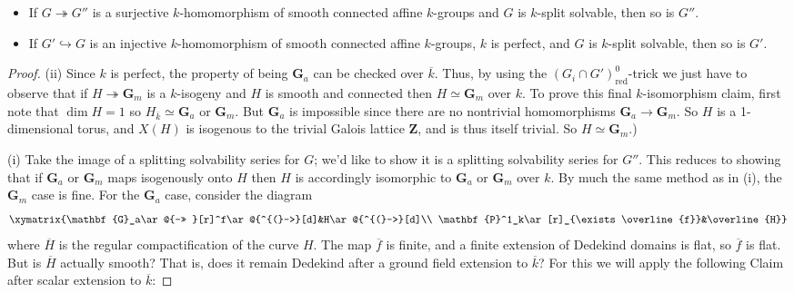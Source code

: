 \documentclass[10pt]{article}
\makeatletter
\renewcommand{\(}{\left(}
\renewcommand{\)}{\right)}
\renewcommand{\bar}{\overline}
\newcommand{\xycof}{\ar@{^{(}->}}
\newcommand{\xyfib}{\ar@{->> }}
\numberwithin{thm}{subsection}
\makeatother
\begin{document}
\begin{ex}\label{splitsolvablequotientsandsubs}
\begin{itemize}
\item[(i)]If $G\twoheadrightarrow G''$ is a surjective $k$-homomorphism
of smooth connected affine $k$-groups and $G$ is $k$-split solvable, then so is $G''$.
\item[(ii)]If $G'\hookrightarrow G$ is an injective $k$-homomorphism
of smooth connected affine $k$-groups, $k$ is perfect,
and $G$ is $k$-split solvable, then so is $G'$.
\end{itemize}
\begin{proof}
(ii) Since $k$ is perfect, the property of being
$\mathbf{G}_a$ can be checked over $\bar k$.  Thus, by using the $(G_i\cap G')_\mathrm{red}^0$-trick
we just have to observe that if $H\twoheadrightarrow \mathbf{G}_m$ is a $k$-isogeny
and $H$ is smooth and connected then $H\simeq \mathbf{G}_m$ over $k$. 
To prove this final $k$-isomorphism claim, first note that 
$\dim H =1$ so $H_{\overline{k}} \simeq \mathbf{G}_a$ or $\mathbf{G}_m$.
But $\mathbf{G}_a$ is impossible since there are no nontrivial
homomorphisms $\mathbf{G}_a\rightarrow\mathbf{G}_m$.
So $H$ is a 1-dimensional torus, and $X(H)$ is isogenous to the trivial Galois lattice $\mathbf{Z}$, and is thus itself trivial. So $H\simeq \mathbf{G}_m$.)

(i) Take the image of a splitting solvability series for $G$;
we'd like to show it is a splitting solvability series for $G''$.
This reduces to showing that if $\mathbf{G}_a$ or $\mathbf{G}_m$ maps
isogenously onto $H$
then $H$ is accordingly isomorphic to $\mathbf{G}_a$ or $\mathbf{G}_m$ over $k$.
By much the same method as in (i), the $\mathbf{G}_m$ case is fine.
For the $\mathbf{G}_a$ case, consider the diagram
\[\xymatrix{\mathbf{G}_a\xyfib[r]^f\xycof[d]&H\xycof[d]\\
\mathbf{P}^1_k\ar[r]_{\exists \overline{f}}&\overline{H}}\]
where $\overline{H}$ is the regular compactification of the curve
$H$.
The map $\overline{f}$ is finite, and a finite extension of Dedekind domains is flat,
so $\overline{f}$ is flat.  But is $\overline{H}$ actually smooth?  That is, does
it remain Dedekind after a ground field extension to $\bar k$?  For this we will apply
the following Claim after scalar extension to $\bar k$:


\end{proof}
\end{ex}
\end{document}
